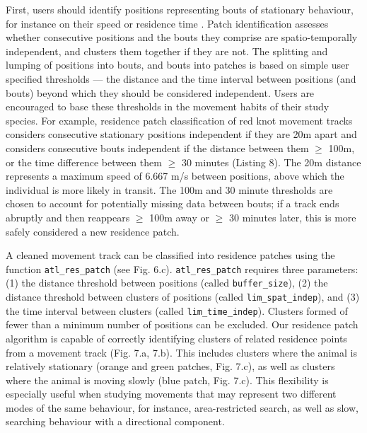 \documentclass[10pt,paper=a4,headings=standardclasses
]{scrartcl}
\begin{document}
First, users should identify positions representing bouts of stationary behaviour, for instance on their speed or residence time \citep{bracis2018}.
Patch identification assesses whether consecutive positions and the bouts they comprise are spatio-temporally independent, and clusters them together if they are not.
The splitting and lumping of positions into bouts, and bouts into patches is based on simple user specified thresholds --- the distance and the time interval between positions (and bouts) beyond which they should be considered independent.
Users are encouraged to base these thresholds in the movement habits of their study species.
For example, residence patch classification of red knot movement tracks considers consecutive stationary positions independent if they are 20m apart and considers consecutive bouts independent if the distance between them $\geq$ 100m, or the time difference between them $\geq$ 30 minutes (Listing 8).
The 20m distance represents a maximum speed of 6.667 m/s between positions, above which the individual is more likely in transit.
The 100m and 30 minute thresholds are chosen to account for potentially missing data between bouts; if a track ends abruptly and then reappears $\geq$ 100m away or $\geq$ 30 minutes later, this is more safely considered a new residence patch.

A cleaned movement track can be classified into residence patches using the function \texttt{atl\_res\_patch} (see Fig. 6.c).
\texttt{atl\_res\_patch} requires three parameters: (1) the distance threshold between positions (called \texttt{buffer\_size}), (2) the distance threshold between clusters of positions (called \texttt{lim\_spat\_indep}), and (3) the time interval between clusters (called \texttt{lim\_time\_indep}).
Clusters formed of fewer than a minimum number of positions can be excluded.
Our residence patch algorithm is capable of correctly identifying clusters of related residence points from a movement track (Fig. 7.a, 7.b).
This includes clusters where the animal is relatively stationary (orange and green patches, Fig. 7.c), as well as clusters where the animal is moving slowly (blue patch, Fig. 7.c).
This flexibility is especially useful when studying movements that may represent two different modes of the same behaviour, for instance, area-restricted search, as well as slow, searching behaviour with a directional component.
\end{document}
